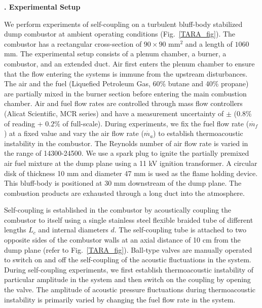 \documentclass[twocolumn,10pt]{article} %
\renewcommand{\section}%
              [1]%
              {%
               \bgroup%
               \flushleft%
               \small\bf%
               \stepcounter{section}%
               \arabic{section}. #1%
               \par%
               \egroup%
              }%
\begin{document}
\section{Experimental Setup} \addvspace{10pt}

We perform experiments of self-coupling on a turbulent bluff-body stabilized dump combustor at ambient operating conditions (Fig.~\ref{TARA_fig}). The combustor has a rectangular cross-section of $ 90 \times 90$ $\text{mm}^2$ and a length of $1060$ $\text{mm}$. The experimental setup consists of a plenum chamber, a burner, a combustor, and an extended duct. Air first enters the plenum chamber to ensure that the flow entering the systems is immune from the upstream disturbances. The air and the fuel (Liquefied Petroleum Gas, 60\% butane and 40\% propane) are partially mixed in the burner section before entering the main combustion chamber. Air and fuel flow rates are controlled through mass flow controllers (Alicat Scientific, MCR series) and have a measurement uncertainty of $\pm$ ($0.8 \%$ of reading + $0.2\%$ of full-scale). During experiments, we fix the fuel flow rate ($\dot{m_f}$) at a fixed value and vary the air flow rate ($\dot{m_a}$) to establish thermoacoustic instability in the combustor. The Reynolds number of air flow rate is varied in the range of 14300-24500. We use a spark plug to ignite the partially premixed air fuel mixture at the dump plane using a 11 kV ignition transformer. A circular disk of thickness 10 mm and diameter 47 mm is used as the flame holding device. This bluff-body is positioned at 30 mm downstream of the dump plane. The combustion products are exhausted through a long duct into the atmosphere. 

Self-coupling is established in the combustor by acoustically coupling the combustor to itself using a single stainless steel flexible braided tube of different lengths $L_c$ and internal diameters $d$. The self-coupling tube is attached to two opposite sides of the combustor walls at an axial distance of 10 cm from the dump plane (refer to Fig.~\ref{TARA_fig}).  Ball-type valves are manually operated to switch on and off the self-coupling of the acoustic fluctuations in the system. During self-coupling experiments, we first establish thermoacoustic instability of particular amplitude in the system and then switch on the coupling by opening the valve. The amplitude of acoustic pressure fluctuations during thermoacoustic instability is primarily varied by changing the fuel flow rate in the system.  
\end{document}
